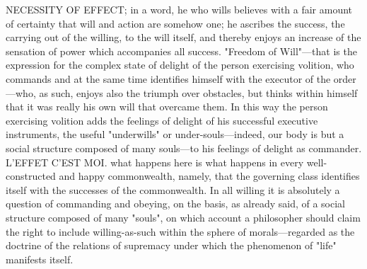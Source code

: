 \documentclass[12pt]{article}
\begin{document}
NECESSITY OF EFFECT; in a word, he who wills believes with a fair amount of certainty that will and action are somehow one; he ascribes the success, the carrying out of the willing, to the will itself, and thereby enjoys an increase of the sensation of power which accompanies all success. "Freedom of Will"---that is the expression for the complex state of delight of the person exercising volition, who commands and at the same time identifies himself with the executor of the order---who, as such, enjoys also the triumph over obstacles, but thinks within himself that it was really his own will that overcame them. In this way the person exercising volition adds the feelings of delight of his successful executive instruments, the useful "underwills" or under-souls---indeed, our body is but a social structure composed of many souls---to his feelings of delight as commander. L'EFFET C'EST MOI. what happens here is what happens in every well-constructed and happy commonwealth, namely, that the governing class identifies itself with the successes of the commonwealth. In all willing it is absolutely a question of commanding and obeying, on the basis, as already said, of a social structure composed of many "souls", on which account a philosopher should claim the right to include willing-as-such within the sphere of morals---regarded as the doctrine of the relations of supremacy under which the phenomenon of "life" manifests itself.
\end{document}
